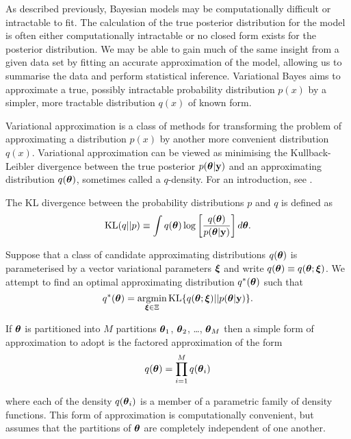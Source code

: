 As described previously, Bayesian models may be computationally difficult or intractable to fit. The
calculation of the true posterior distribution for the model is often either computationally intractable or no
closed form exists for the posterior distribution. We may be able to gain much of the same insight from a
given data set by fitting an accurate approximation  of the model, allowing us to summarise the data and
perform statistical inference. Variational Bayes aims to approximate a true, possibly intractable probability
distribution $p(x)$ by a simpler, more tractable distribution $q(x)$ of known form.

Variational approximation is a class of methods for transforming the problem of approximating a distribution
$p(x)$ by another more convenient distribution $q(x)$. Variational approximation can be viewed as minimising
the Kullback- Leibler divergence between the true posterior $p({\boldsymbol \theta}|{\bf y})$ and an approximating distribution
$q({\boldsymbol \theta})$, sometimes called a $q$-density. For an introduction, see \cite{Ormerod2010}.

The KL divergence between the probability distributions $p$ and $q$ is defined as
$$
	\text{KL}(q || p) \equiv \int q({\boldsymbol \theta}) \log \left [ \frac{q({\boldsymbol \theta})}{p({\boldsymbol \theta} | {\bf y})} \right ] d {\boldsymbol \theta}.
$$

Suppose that a class of candidate approximating distributions $q({\boldsymbol \theta})$ is parameterised by a vector
variational parameters ${\boldsymbol \xi}$ and write $q({\boldsymbol \theta})\equiv q({\boldsymbol \theta};{\boldsymbol \xi})$. We attempt to find an  optimal
approximating distribution $q^*({\boldsymbol \theta})$ such that
$$
	\ds q^*(\vtheta) = \argmin_{\vxi \in \Xi} \text{KL} \{ {q(\vtheta;\vxi) || p(\vtheta|\vy)} \}.
$$

\noindent If ${\boldsymbol \theta}$ is partitioned into $M$ partitions ${\boldsymbol \theta}_1$, ${\boldsymbol \theta}_2$, \ldots, ${\boldsymbol \theta}_M$ then a 
simple form of approximation to adopt is the factored approximation of the form
$$
	q({\boldsymbol \theta}) = \prod_{i=1}^M q({\boldsymbol \theta}_i)
$$

\noindent where each of the density $q({\boldsymbol \theta}_i)$ is a member of a parametric family of density functions.
This form of approximation is computationally convenient, but assumes that the partitions of ${\boldsymbol \theta}$ are
completely independent of one another.

